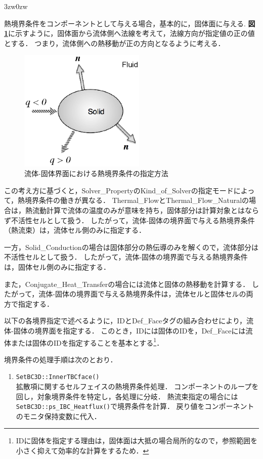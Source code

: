\begin{indentation}{3zw}{0zw}
{
熱境界条件をコンポーネントとして与える場合，基本的に，固体面に与える.
\textbf{図\ref{fig:heat bc on solid}}に示すように，固体面から流体側へ法線を考えて，法線方向が指定値の正の値とする．
つまり，流体側への熱移動が正の方向となるように考える．

\begin{figure}[htbp]
\begin{center}
\includegraphics[width=6cm,clip]{heatBC.eps}
\end{center}
\caption{流体-固体界面における熱境界条件の指定方法}
\label{fig:heat bc on solid}
\end{figure}

この考え方に基づくと，Solver\_PropertyのKind\_of\_Solverの指定モードによって，熱境界条件の働きが異なる．
Thermal\_FlowとThermal\_Flow\_Naturalの場合は，熱流動計算で流体の温度のみが意味を持ち，固体部分は計算対象とはならず不活性セルとして扱う．
したがって，流体-固体の境界面で与える熱境界条件（熱流束）は，流体セル側のみに指定する．

一方，Solid\_Conductionの場合は固体部分の熱伝導のみを解くので，流体部分は不活性セルとして扱う．
したがって，流体-固体の境界面で与える熱境界条件は，固体セル側のみに指定する．

また，Conjugate\_Heat\_Transferの場合には流体と固体の熱移動を計算する．
したがって，流体-固体の境界面で与える熱境界条件は，流体セルと固体セルの両方で指定する．

以下の各境界指定で述べるように，IDとDef\_Faceタグの組み合わせにより，流体-固体の境界面を指定する．
このとき，IDには固体のIDを，Def\_Faceには流体または固体のIDを指定することを基本とする\footnote{IDに固体を指定する理由は，固体面は大抵の場合局所的なので，参照範囲を小さく抑えて効率的な計算をするため．}．


境界条件の処理手順は次のとおり．
\begin{enumerate}
\item \verb|SetBC3D::InnerTBCface()|\\
拡散項に関するセルフェイスの熱境界条件処理．
コンポーネントのループを回し，対象境界条件を特定し，各処理に分岐．
熱流束指定の場合には\verb|SetBC3D::ps_IBC_Heatflux()|で境界条件を計算．
戻り値をコンポーネントのモニタ保持変数に代入．
\vspace{2mm}


\end{enumerate}}
\end{indentation}

